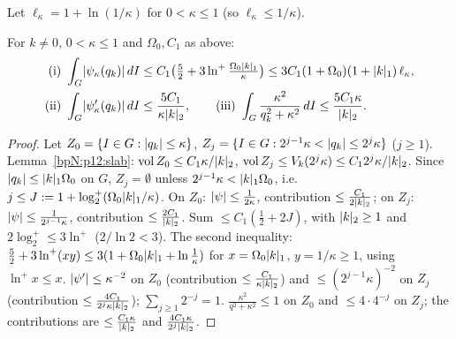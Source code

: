 Let $\ell_\kappa=1+\ln(1/\kappa)$ for $0<\kappa\le1$ (so $\ell_\kappa\le1/\kappa$).

\begin{lemma}\label{bpN:p12:shells}
For $k\ne0$, $0<\kappa\le1$ and $\Omega_0,C_1$ as above:
\begin{align*}
\text{(i)}&\ \int_G\abs{\psi_\kappa(q_k)}\,dI\le C_1\bigl(\tfrac52+3\ln^+\tfrac{\Omega_0\abs k_1}\kappa\bigr)\le3C_1(1+\Omega_0)(1+\abs k_1)\,\ell_\kappa,\\
\text{(ii)}&\ \int_G\abs{\psi'_\kappa(q_k)}\,dI\le\frac{5C_1}{\kappa\abs k_2},\qquad
\text{(iii)}\ \int_G\frac{\kappa^2}{q_k^2+\kappa^2}\,dI\le\frac{5C_1\kappa}{\abs k_2}.
\end{align*}
\end{lemma}
\begin{proof}
\label{stepN:p12:sh-shells} Let $Z_0=\{I\in G:\lvert q_k\rvert\le\kappa\}$, $Z_j=\{I\in G:2^{j-1}\kappa<\lvert q_k\rvert\le2^j\kappa\}$ ($j\ge1$). Lemma~\ref{bpN:p12:slab}: $\operatorname{vol} Z_0\le C_1\kappa/\lvert k\rvert_2$, $\operatorname{vol} Z_j\le V_k(2^j\kappa)\le C_12^j\kappa/\lvert k\rvert_2$. Since $\lvert q_k\rvert\le\lvert k\rvert_1\Omega_0$ on $G$, $Z_j=\emptyset$ unless $2^{j-1}\kappa<\lvert k\rvert_1\Omega_0$, i.e.\ $j\le J:=1+\log_2^+(\Omega_0\lvert k\rvert_1/\kappa)$.
\label{stepN:p12:sh-i} On $Z_0$: $\lvert \psi\rvert\le\frac1{2\kappa}$, contribution $\le\frac{C_1}{2\lvert k\rvert_2}$; on $Z_j$: $\lvert \psi\rvert\le\frac1{2^{j-1}\kappa}$, contribution $\le\frac{2C_1}{\lvert k\rvert_2}$. Sum $\le C_1(\frac12+2J)$, with $\lvert k\rvert_2\ge1$ and $2\log_2^+\le3\ln^+$ ($2/\ln2<3$). The second inequality: $\frac52+3\ln^+(xy)\le3(1+\Omega_0\lvert k\rvert_1+\ln\frac1\kappa)$ for $x=\Omega_0\lvert k\rvert_1$, $y=1/\kappa\ge1$, using $\ln^+x\le x$.
\label{stepN:p12:sh-ii} $\lvert \psi'\rvert\le\kappa^{-2}$ on $Z_0$ (contribution $\le\frac{C_1}{\kappa\lvert k\rvert_2}$) and $\le(2^{j-1}\kappa)^{-2}$ on $Z_j$ (contribution $\le\frac{4C_1}{2^j\kappa\lvert k\rvert_2}$); $\sum_{j\ge1}2^{-j}=1$.
\label{stepN:p12:sh-iii} $\frac{\kappa^2}{q^2+\kappa^2}\le1$ on $Z_0$ and $\le4\cdot4^{-j}$ on $Z_j$; the contributions are $\le\frac{C_1\kappa}{\lvert k\rvert_2}$ and $\frac{4C_1\kappa}{2^j\lvert k\rvert_2}$.
\end{proof}

